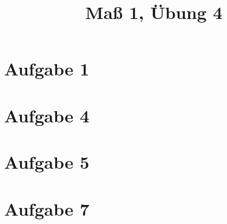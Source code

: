 \documentclass[]{article}
\author{}
\title{Maß 1, Übung 4}
\begin{document}
    \begin{titlepage}
        \maketitle
    \end{titlepage}
    
    \section{Aufgabe 1}
    
    \section{Aufgabe 4}
    
    \section{Aufgabe 5}
    
    \section{Aufgabe 7}
    

    
    
\end{document}
